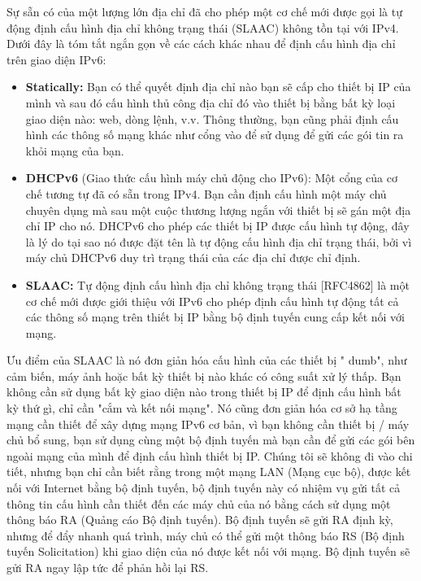 \documentclass{report}
\begin{document}
Sự sẵn có của một lượng lớn địa chỉ đã cho phép một cơ chế mới được gọi là tự động định cấu hình địa chỉ không trạng thái (SLAAC) không tồn tại với IPv4. Dưới đây là tóm tắt ngắn gọn về các cách khác nhau để định cấu hình địa chỉ trên giao diện IPv6:
\begin{itemize}
	\item \textbf{Statically:} Bạn có thể quyết định địa chỉ nào bạn sẽ cấp cho thiết bị IP của mình và sau đó cấu hình thủ công địa chỉ đó vào thiết bị bằng bất kỳ loại giao diện nào: web, dòng lệnh, v.v. Thông thường, bạn cũng phải định cấu hình các thông số mạng khác như cổng vào để sử dụng để gửi các gói tin ra khỏi mạng của bạn.
	\item \textbf{DHCPv6} (Giao thức cấu hình máy chủ động cho IPv6): Một cổng của cơ chế tương tự đã có sẵn trong IPv4. Bạn cần định cấu hình một máy chủ chuyên dụng mà sau một cuộc thương lượng ngắn với thiết bị sẽ gán một địa chỉ IP cho nó. DHCPv6 cho phép các thiết bị IP được cấu hình tự động, đây là lý do tại sao nó được đặt tên là tự động cấu hình địa chỉ trạng thái, bởi vì máy chủ DHCPv6 duy trì trạng thái của các địa chỉ được chỉ định.
	\item \textbf{SLAAC:} Tự động định cấu hình địa chỉ không trạng thái [RFC4862] là một cơ chế mới được giới thiệu với IPv6 cho phép định cấu hình tự động tất cả các thông số mạng trên thiết bị IP bằng bộ định tuyến cung cấp kết nối với mạng.
\end{itemize}

Ưu điểm của SLAAC là nó đơn giản hóa cấu hình của các thiết bị " dumb", như cảm biến, máy ảnh hoặc bất kỳ thiết bị nào khác có công suất xử lý thấp. Bạn không cần sử dụng bất kỳ giao diện nào trong thiết bị IP để định cấu hình bất kỳ thứ gì, chỉ cần "cắm và kết nối mạng". Nó cũng đơn giản hóa cơ sở hạ tầng mạng cần thiết để xây dựng mạng IPv6 cơ bản, vì bạn không cần thiết bị / máy chủ bổ sung, bạn sử dụng cùng một bộ định tuyến mà bạn cần để gửi các gói bên ngoài mạng của mình để định cấu hình thiết bị IP. Chúng tôi sẽ không đi vào chi tiết, nhưng bạn chỉ cần biết rằng trong một mạng LAN (Mạng cục bộ), được kết nối với Internet bằng bộ định tuyến, bộ định tuyến này có nhiệm vụ gửi tất cả thông tin cấu hình cần thiết đến các máy chủ của nó bằng cách sử dụng một thông báo RA (Quảng cáo Bộ định tuyến). Bộ định tuyến sẽ gửi RA định kỳ, nhưng để đẩy nhanh quá trình, máy chủ có thể gửi một thông báo RS (Bộ định tuyến Solicitation) khi giao diện của nó được kết nối với mạng. Bộ định tuyến sẽ gửi RA ngay lập tức để phản hồi lại RS.
\end{document}
